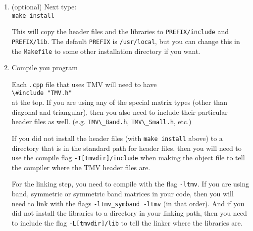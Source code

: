 \documentclass[twoside,letterpaper,11pt]{article}
\newcommand{\myissuesx}{http://code.google.com/p/tmv-cpp/issues}
\newcommand{\myissues}{\url{\myissuesx}}
\renewcommand{\tt}[1]{{\lstinline {#1}}}
\begin{document}
\begin{enumerate}
Then you should run the three test suites.
They should output a bunch of lines reading \texttt{[{\em Something}] passed all tests}.
If one of them ends in a line that starts with \texttt{Error}, 
then please post a bug report at \myissues\ about the problem including what compiler
you are using, some details about your system, and what (if any) BLAS and LAPACK
libraries you are linking to.

You may also want to make the example programs by typing:\\
\texttt{make examples}

This will make five executables called \texttt{vector}, \texttt{matrix}, \texttt{division},
\texttt{bandmatrix}, and \texttt{symmatrix}.
These programs, along with their corresponding source code in the \texttt{examples}
directory, give concrete examples of some of the common things you might want
to do with the TMV library.  They don't really try to be comprehensive,
but they do give a pretty good overview of the main features,
so looking at them may be a useful way to get started programming with TMV.

\item
(optional) Next type:\\
\texttt{make install}

This will copy the header files and the libraries to \texttt{PREFIX/include} and 
\texttt{PREFIX/lib}.  The default \texttt{PREFIX} is \texttt{/usr/local}, but you can change
this in the \texttt{Makefile} to some other installation directory if you want.

\item
Compile you program

Each \texttt{.cpp} file that uses TMV will need to have \\
\tt{\#include "TMV.h"}\\
at the top.
If you are using any of the special matrix types (other than diagonal and triangular),
then you also need to include their particular header files as well. (e.g.
\tt{TMV\_Band.h}, \tt{TMV\_Small.h}, etc.)

If you did not install the header files (with \texttt{make install} above) to 
a directory that is in the standard path for header files, then 
you will need to use the compile flag
\texttt{-I[tmvdir]/include} when making the object file to tell the 
compiler where the TMV header files are.

For the linking step, you need to compile with the flag
\texttt{-ltmv}.
If you are using band, symmetric or symmetric band matrices
in your code, then you will 
need to link with the flags \texttt{-ltmv\_symband -ltmv} (in that order).
And if you did not install the libraries to a directory in your linking path,
then you need to include the flag
\texttt{-L[tmvdir]/lib} to tell the linker where the libraries are.


\end{enumerate}
\end{document}
